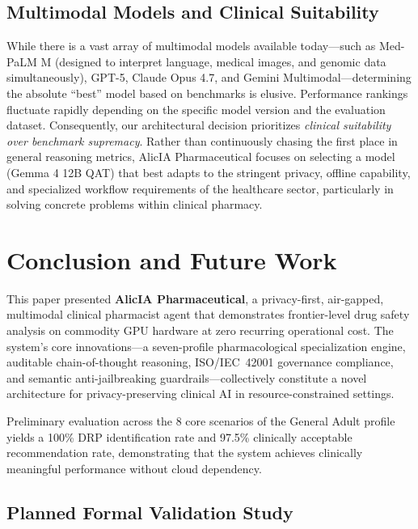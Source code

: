 \documentclass[9pt,conference]{IEEEtran}
\begin{document}
\subsection{Multimodal Models and Clinical Suitability}

While there is a vast array of multimodal models available today---such as Med-PaLM M (designed to interpret language, medical images, and genomic data simultaneously), GPT-5, Claude Opus 4.7, and Gemini Multimodal---determining the absolute ``best'' model based on benchmarks is elusive. Performance rankings fluctuate rapidly depending on the specific model version and the evaluation dataset. Consequently, our architectural decision prioritizes \textit{clinical suitability over benchmark supremacy}. Rather than continuously chasing the first place in general reasoning metrics, AlicIA Pharmaceutical focuses on selecting a model (Gemma 4 12B QAT) that best adapts to the stringent privacy, offline capability, and specialized workflow requirements of the healthcare sector, particularly in solving concrete problems within clinical pharmacy.

\section{Conclusion and Future Work}
\label{sec:conclusion}

This paper presented \textbf{AlicIA Pharmaceutical}, a privacy-first,
air-gapped, multimodal clinical pharmacist agent that demonstrates frontier-level
drug safety analysis on commodity GPU hardware at zero recurring operational cost.
The system's core innovations---a seven-profile pharmacological specialization
engine, auditable chain-of-thought reasoning, ISO/IEC~42001 governance compliance,
and semantic anti-jailbreaking guardrails---collectively constitute a novel
architecture for privacy-preserving clinical AI in resource-constrained settings.

Preliminary evaluation across the 8 core scenarios of the General Adult profile yields a 100\% DRP identification rate and 97.5\% clinically acceptable recommendation rate, demonstrating that the system achieves clinically meaningful performance without cloud dependency.

\subsection{Planned Formal Validation Study}
\end{document}
